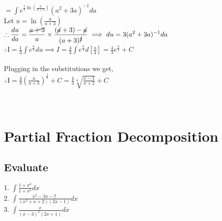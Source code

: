 \documentclass[14pt]{article}
\begin{document}
	$\displaystyle = \int e^{\frac{1}{4}\ln\left(\frac{a}{a+3}\right)} (a^2+3a)^{-1}da$\\
	Let $\displaystyle u=\ln \left(\frac{a}{a+3}\right)$\\
	$\displaystyle \therefore \frac{du}{da} = \frac{\cancel{a+3}}{a}\times\frac{(\cancel{a}+3)-\cancel{a}}{(a+3)^{\cancel{2}}}\implies du = 3(a^2+3a)^{-1}da$\\
	$\displaystyle \therefore \text{I} = \frac{1}{3}\int e^{\frac{u}{4}}du \implies I = \frac{4}{3} \int e^{\frac{u}{4}} d\left[\frac{u}{4}\right] = \frac{4}{3} e^{\frac{u}{4}} + C$ \\ \\
	Plugging in the substitutions we get,\\
	$\displaystyle
		\therefore \text{I} = \frac{4}{3} \left(\frac{a}{a+3}\right)^{\frac{1}{4}} +C=\boxed{\frac{4}{3} \sqrt[4]{\frac{x-1}{x+2}} +C}
	$
	\\ \\ \\
	\section{Partial Fraction Decomposition}
	\subsection{Evaluate}
	1. $\displaystyle \int \frac{1+x^3}{1+x^2}dx$ \\
	2. $\displaystyle \int \frac{x^2-3x-7}{(x^2+x+2)(2x-1)}dx$ \\
	3. $\displaystyle \int \frac{x}{(x-3)^2(2x+1)}dx$
\end{document}
